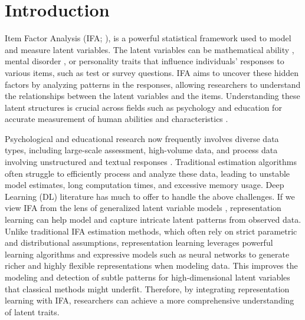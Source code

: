 \documentclass[a4paper,12pt]{article}
\theoremstyle{plain} %
\theoremstyle{remark} %
\theoremstyle{definition} %
\begin{document}
\section{Introduction}
Item Factor Analysis (IFA; \citealp[e.g.,][]{bock1988full, wirth2007item}), is a powerful statistical framework used to model and measure latent variables. The latent variables can be mathematical ability \citep{rutkowski2013handbook}, mental disorder \citep{stochl2012mokken}, or personality traits \citep{balsis2017item} that influence individuals' responses to various items, such as test or survey questions. IFA aims to uncover these hidden factors by analyzing patterns in the responses, allowing researchers to understand the relationships between the latent variables and the items. Understanding these latent structures is crucial across fields such as psychology and education for accurate measurement of human abilities and characteristics \citep{wirth2007item,chen2021item}.

Psychological and educational research now frequently involves diverse data types, including large-scale assessment, high-volume data, and process data involving unstructured and textual responses \citep[e.g.,][]{weston2015undergraduate, zhang2023accurate, ma2024note}. Traditional estimation algorithms often struggle to efficiently process and analyze these data, leading to unstable model estimates, long computation times, and excessive memory usage. Deep Learning (DL) literature has much to offer to handle the above challenges. If we view IFA from the lens of generalized latent variable models \citep[][]{muthen2002beyond, rabe2008multilevel}, representation learning \citep{bengio2013representation} can help model and capture intricate latent patterns from observed data. Unlike traditional IFA estimation methods, which often rely on strict parametric and distributional assumptions, representation learning leverages powerful learning algorithms and expressive models such as neural networks to generate richer and highly flexible representations when modeling data. This improves the modeling and detection of subtle patterns for high-dimensional latent variables that classical methods might underfit. Therefore, by integrating representation learning with IFA, researchers can achieve a more comprehensive understanding of latent traits.
\end{document}

